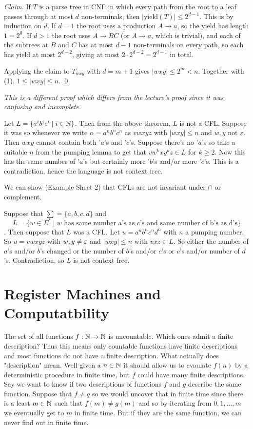 \documentclass[tikx, border = 10pt]{article}
\begin{document}
\emph{Claim.} If $T$ is a parse tree in CNF in which every path from the root to a leaf
passes through at most $d$ non-terminals, then $|\text{yield}(T)|\le 2^{d-1}$.
This is by induction on $d$. If $d=1$ the root uses a production $A\to a$, so the yield has
length $1=2^0$. If $d>1$ the root uses $A\to BC$ (or $A\to a$, which is trivial), and each
of the subtrees at $B$ and $C$ has at most $d-1$ non-terminals on every path, so each has
yield at most $2^{d-2}$, giving at most $2\cdot 2^{d-2}=2^{d-1}$ in total.

Applying the claim to $T_{wxy}$ with $d=m+1$ gives $|wxy|\le 2^m < n$. Together with (1),
$1\le |wxy|\le n$. \qed
\begin{remark}
	\textit{This is a different proof which differs from the lecture's proof since it was confusing and incomplete.}
\end{remark}
\begin{example}
	Let $ L = \{a^ib^i c^i\mid i \in \mathbb{N} \}$. Then from the above theorem, $ L $ is not a CFL. Suppose it was so whenever we write $ \alpha = a^n b^n c^n $ as $ vwxyz $ with $ |wxy|\le n $ and $ w,y $ not $ \varepsilon $. Then $ wxy $ cannot contain both '$ a $'s and '$ c $'s. Suppose there's no '$ a $'s so take a suitable $ n $ from the pumping lemma to get that $ vw^k xy^kz\in L $ for $ k\ge 2 $. Now this has the same number of '$ a $'s but certainly more '$ b $'s and/or more '$ c $'s. This is a contradiction, hence the language is not context free. 
\end{example}
We can show (Example Sheet 2) that CFLs are not invariant under $ \cap $ or complement. 
\begin{example}
	Suppose that $ \sum = \{a,b,c,d\} $ and 
	\[
		L = \{w\in \Sigma^* \mid w \text{ has same number a's as c's and same number of b's as d's}\} 
	\].
	Then suppose that $ L $ was a CFL. Let $ u =a^nb^nc^nd^n $ with $ n $ a pumping number. So $ u=vwxyz $ with $ w,y\ne \varepsilon $ and $ |wxy| \le n $ with $ vxz\in L $. So either the number of $ a $'s and/or $ b $'s changed or the number of $ b $'s and/or $ c $'s or $ c $'s and/or number of $ d $'s. Contradiction, so $ L $ is not context free.
\end{example}
\section{Register Machines and Computatbility}
The set of all functions $ f: \mathbb{N} \to \mathbb{N} $ is uncountable. Which ones admit a finite description? Thus this means only countable functions have finite descriptions and most functions do not have a finite description. What actually does "description" mean. Well given a $ n\in \mathbb{N} $ it should allow us to evaulate $ f(n) $ by a deterministic procedure in finite time, but $ f $ could have many finite descriptions. Say we want to know if two descriptions of functions $ f $ and $ g $ describe the same function. Suppose that $ f\ne g $ so we would uncover that in finite time since there is a least $ m\in \mathbb{N} $ such that $ f(m) \ne g(m) $ and so by iterating from $ 0,1,\dots, m $ we eventually get to $ m $ in finite time. But if they are the same function, we can never find out in finite time.
\end{document}
